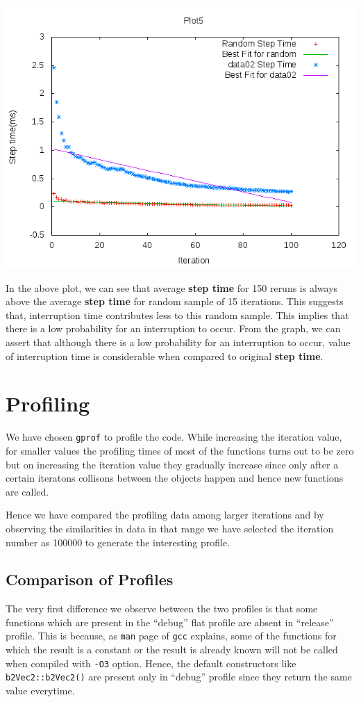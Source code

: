 \documentclass[11pt]{article}
\begin{document}
\centerline{\includegraphics[scale=0.7]{g28_plot05}}
In the above plot, we can see that average {\bf step time} for 150 reruns is always above the average {\bf step time} for random sample of 15 iterations. This suggests that, interruption time contributes less to this random sample. This implies that there is a low probability for an interruption to occur. From the graph, we can assert that although there is a low probability for an interruption to occur, value of interruption time is considerable when compared to original {\bf step time}.
\section{Profiling}
We have chosen {\tt gprof} to profile the code. While increasing the iteration value, for smaller values the profiling times of most of the functions turns out to be zero but on increasing the iteration value they gradually increase since only after a certain iteratons collisons between the objects happen and hence new functions are called.

Hence we have compared the profiling data among larger iterations and by observing the similarities in data in that range we have selected the iteration number as 100000 to generate the interesting profile.
\subsection{Comparison of  Profiles}
The very first difference we observe between the two profiles is that some functions which are present in the ``debug'' flat profile are absent in ``release'' profile. This is because, as {\tt man} page of {\tt gcc} explains, some of the functions for which the result is a constant or the result is already known will not be called when compiled with {\tt -O3} option. Hence, the default constructors like {\tt b2Vec2::b2Vec2()} are present only in ``debug'' profile since they return the same value everytime.
\end{document}
